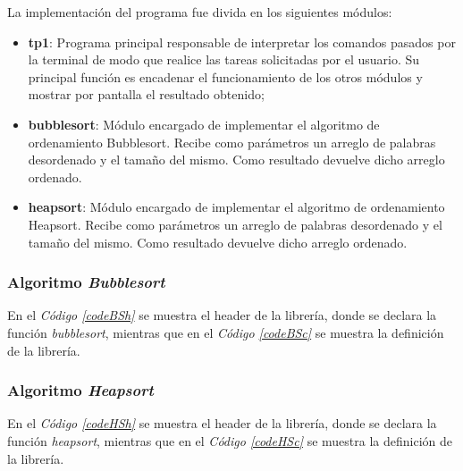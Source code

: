 \documentclass{article}
\newcommand{\refcode}[1]{\textit{Código \ref{#1}}}
\begin{document}
	La implementación del programa fue divida en los siguientes módulos:
	\medskip

\begin{itemize}

\itemsep=2pt \topsep=0pt \partopsep=0pt \parskip=0pt \parsep=0pt
	\item \textbf{tp1}: Programa principal responsable de interpretar los comandos pasados por la terminal de modo que realice las tareas solicitadas por el usuario. Su principal función es encadenar el funcionamiento de los otros módulos y mostrar por pantalla el resultado obtenido;
	\item \textbf{bubblesort}: Módulo encargado de implementar el algoritmo de ordenamiento Bubblesort. Recibe como parámetros un arreglo de palabras desordenado y el tamaño del mismo. Como resultado devuelve dicho arreglo ordenado.
	\item \textbf{heapsort}: Módulo encargado de implementar el algoritmo de ordenamiento Heapsort. Recibe como parámetros un arreglo de palabras desordenado y el tamaño del mismo. Como resultado devuelve dicho arreglo ordenado.

\end{itemize}	
\medskip


\subsubsection{Algoritmo \textit{Bubblesort}}

	En el \refcode{codeBSh} se muestra el header de la librería, donde se declara la función \textit{bubblesort}, mientras que en el \refcode{codeBSc} se muestra la definición de la librería.

\lstset{ language = C } %
 
\bigskip


\lstset{ language = C } %
 
\bigskip




\subsubsection{Algoritmo \textit{Heapsort}}

	En el \refcode{codeHSh} se muestra el header de la librería, donde se declara la función \textit{heapsort}, mientras que en el \refcode{codeHSc} se muestra la definición de la librería.
\end{document}
